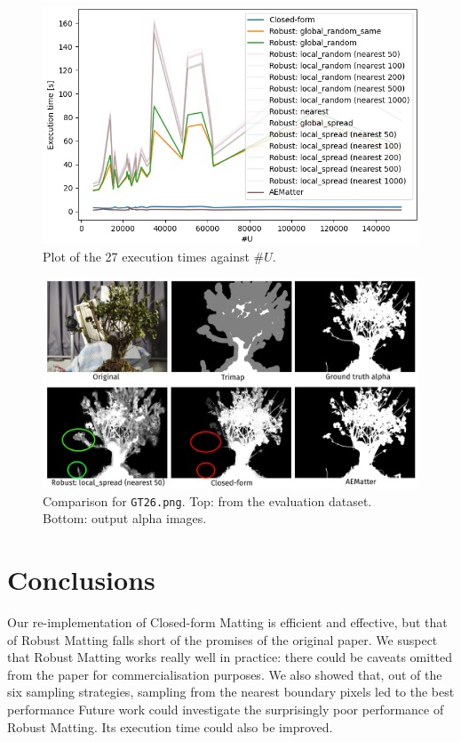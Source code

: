\documentclass{article}
\theoremstyle{definition}
\begin{document}
\begin{multicols}{2}[]
\begin{figure}[H]
    \centering
    \includegraphics[width=0.88\columnwidth]{t-against-U}
    \caption{Plot of the 27 execution times against $\#U$.}
    \label{fig:t-against-U}
\end{figure}

\begin{figure}[H]
    \centering
    \includegraphics[width=0.88\columnwidth]{qualitative}
    \caption{Comparison for \texttt{GT26.png}. Top: from the evaluation dataset. Bottom: output alpha images.}
    \label{fig:qualitative}
\end{figure}

\section{Conclusions}

Our re-implementation of Closed-form Matting is efficient and effective, but that of Robust Matting falls short of the promises of the original paper. We suspect that Robust Matting works really well in practice: there could be caveats omitted from the paper for commercialisation purposes. We also showed that, out of the six sampling strategies, sampling from the nearest boundary pixels led to the best performance Future work could investigate the surprisingly poor performance of Robust Matting. Its execution time could also be improved.


\end{multicols}
\newpage


\end{document}
